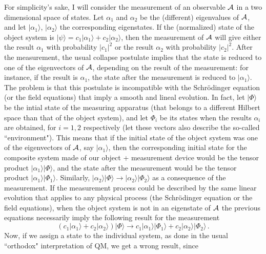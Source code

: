 \documentclass[published]{JHEP3}
\begin{document}
For simplicity's sake, I will consider the measurement of an
observable ${\cal A}$ in a two dimensional space of states. Let
$\alpha_1$ and $\alpha_2$ be the (different) eigenvalues of ${\cal
A}$, and let $\vert \alpha_1\rangle$, $\vert \alpha_2\rangle$ the
corresponding eigenstates. If the (normalized) state of the object
system is $\vert\psi\rangle = c_1\vert \alpha_1\rangle+c_2\vert
\alpha_2\rangle$, then the measurement of ${\cal A}$ will give either
the result $\alpha_1$ with probability $\vert c_1\vert^2$ or the
result $\alpha_2$ with probability $\vert c_2\vert^2$.  After the
measurement, the usual collapse postulate implies that the state is
reduced to one of the eigenvectors of ${\cal A}$, depending on the
result of the measurement: for instance, if the result is $\alpha_1$,
the state after the measurement is reduced to $\vert
\alpha_1\rangle$. The problem is that this postulate is incompatible
with the Schr\"odinger equation (or the field equations) that imply a
smooth and lineal evolution. In fact, let $\vert\Phi\rangle$ be the
intial state of the measuring apparatus (that belongs to a different
Hilbert space than that of the object system), and let $\Phi_i$ be its
states when the results $\alpha_i$ are obtained, for $i=1,2$
respectively (let these vectors also describe the so-called
``environment"). This means that if the initial state of the object
system was one of the eigenvectors of ${\cal A}$, say $\vert
\alpha_1\rangle$, then the corresponding initial state for the
composite system made of our object + measurement device would be the
tensor product $\vert \alpha_1\rangle\vert\Phi\rangle$, and the state
after the measurement would be the tensor product $\vert
\alpha_1\rangle\vert\Phi_1\rangle$. Similarly, $\vert
\alpha_2\rangle\vert\Phi\rangle\to\vert
\alpha_2\rangle\vert\Phi_2\rangle$ as a consequence of the
measurement. If the measurement process could be described by the same
linear evolution that applies to any physical process (the
Schr\"odinger equation or the field equations), when the object system
is not in an eigenstate of ${\cal A}$ the previous equations
necessarily imply the following result for the measurement
\begin{equation}
(c_1\vert \alpha_1\rangle+c_2\vert \alpha_2\rangle)
\vert\Phi\rangle\to c_1\vert \alpha_1\rangle\vert\Phi_1\rangle +
c_2\vert \alpha_2\rangle\vert\Phi_2\rangle\,. \label{eq:1}
\end{equation}
Now, if we assign a state to the individual system, as done in the
usual ``orthodox" interpretation of QM, we get a wrong result, since
\end{document}
